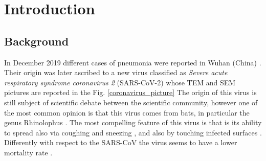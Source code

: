 \documentclass[
12pt, %
a4paper, %
oneside, %
headinclude,footinclude, %
BCOR5mm, %
]{scrartcl}
\begin{document}




\newpage %


\section{Introduction} \label{introduction}

\subsection{Background} \label{Background}
In December 2019 different cases of pneumonia were reported in Wuhan (China) \cite{huang2020clinical}. Their origin was later ascribed to a new virus classified as \textit{Severe acute respiratory syndrome coronavirus 2} (SARS-CoV-2) whose TEM and SEM pictures are reported in the Fig. \ref{coronavirus_picture} The origin of this virus is still subject of scientific debate between the scientific community, however one of the most common opinion is that this virus comes from bats, in particular the genus Rhinolophus \cite{zhou2020pneumonia}. The most compelling feature of this virus is that is its ability to spread also via coughing and sneezing \cite{ghinai2020first}, and also by touching infected surfaces \cite{chang2020protecting}. Differently with respect to the SARS-CoV the virus seems to have a lower mortality rate \cite{sorensen2006severe,weiss2020clinical}.
\end{document}
